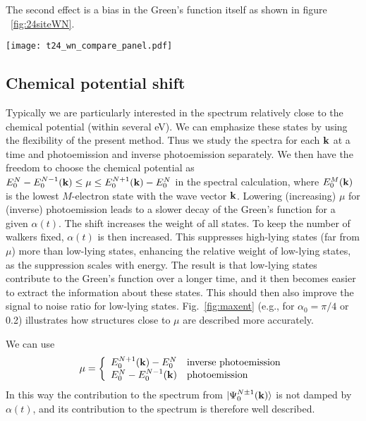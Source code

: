 The second effect is a bias in the Green's function itself as shown in figure ~\ref{fig:24siteWN}.

\begin{figure*}[t]
\texttt{[image: t24\_wn\_compare\_panel.pdf]}
\caption{Photoemission Green's function for $k=(0,0)$ for the Hubbard model
  with an 18-site cluster at $U/t=2$ obtained with FCIQMC and Lanczos with a)
  70000 and b) 17 million walkers, showing a bias in the Green's function due to under-sampling for the
  smaller walker number. }
\label{fig:24siteWN}
\end{figure*}

\subsection{Chemical potential shift}

Typically we are particularly interested in the spectrum relatively close to the
chemical potential (within several eV). We can emphasize these states by using the 
flexibility of the present method. Thus we study the spectra for each ${\bf k}$ at 
a time and photoemission and inverse photoemission separately. We then have the 
freedom to choose the chemical potential as $E_0^N-E_0^{N-1}({\bf k})\le \mu \le 
E_0^{N+1}({\bf k})-E_0^N$ in the spectral calculation, where $E_0^{M}({\bf k})$ 
is the lowest $M$-electron state with the wave vector ${\bf k}$. Lowering (increasing) 
$\mu$ for (inverse) photoemission leads to a slower decay of the Green's function 
for a given $\alpha(t)$. The shift increases the weight of all states. To keep the 
number of walkers fixed,  $\alpha(t)$ is then increased. This suppresses high-lying 
states (far from $\mu$) more than low-lying states, enhancing the relative weight 
of low-lying states, as the suppression scales with energy. The result is that 
low-lying states contribute to the Green's function over a longer time, and it 
then becomes easier to extract the information about these states. This should 
then also improve the signal to noise ratio for low-lying states. Fig.~\ref{fig:maxent} 
(e.g., for $\alpha_0=\pi/4$ or 0.2) illustrates how structures close to $\mu$ 
are described more accurately.

We can use 
\begin{equation}\label{eq:g7}
\mu=\left\{ \begin{array}{ll}
E_0^{N+1}({\bf k})-E_0^N &   {\rm inverse \ photoemission} \\
E_0^N-E_0^{N-1}({\bf k}) &  {\rm photoemission}
\end{array}\right.
\end{equation}
In this way the contribution to the spectrum from $|\Psi_0^{N\pm1}({\bf k})\rangle$ 
is not damped by $\alpha(t)$, and its contribution to the spectrum is therefore well 
described.

